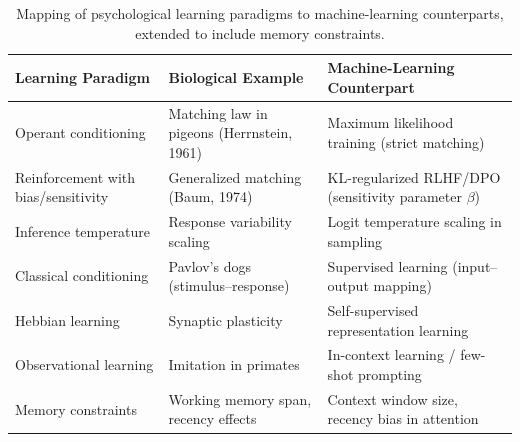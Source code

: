 \begin{table}[ht]
\centering
\begin{tabular}{|p{}|p{}|p{}|}
\hline
\textbf{Learning Paradigm} & \textbf{Biological Example} & \textbf{Machine-Learning Counterpart} \\
\hline
Operant conditioning & Matching law in pigeons (Herrnstein, 1961) & Maximum likelihood training (strict matching) \\
\hline
Reinforcement with bias/sensitivity & Generalized matching (Baum, 1974) & KL-regularized RLHF/DPO (sensitivity parameter $\beta$) \\
\hline
Inference temperature & Response variability scaling & Logit temperature scaling in sampling \\
\hline
Classical conditioning & Pavlov’s dogs (stimulus–response) & Supervised learning (input–output mapping) \\
\hline
Hebbian learning & Synaptic plasticity & Self-supervised representation learning \\
\hline
Observational learning & Imitation in primates & In-context learning / few-shot prompting \\
\hline
Memory constraints & Working memory span, recency effects & Context window size, recency bias in attention \\
\hline
\end{tabular}
\caption{Mapping of psychological learning paradigms to machine-learning counterparts, extended to include memory constraints.}
\label{tab:paradigm_mapping}
\end{table}

